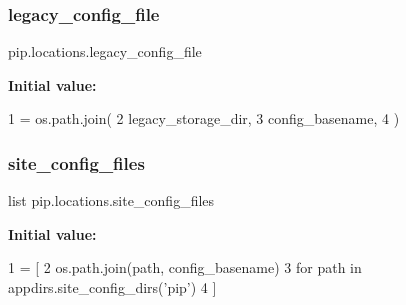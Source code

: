 \subsubsection{\texorpdfstring{legacy\+\_\+config\+\_\+file}{legacy\_config\_file}}
{\footnotesize\ttfamily pip.\+locations.\+legacy\+\_\+config\+\_\+file}

{\bfseries Initial value\+:}
\begin{DoxyCode}
1 =  os.path.join(
2         legacy\_storage\_dir,
3         config\_basename,
4     )
\end{DoxyCode}
\mbox{\label{namespacepip_1_1locations_ad4df8ee1051c2068139f30653041d0a8}} 
\subsubsection{\texorpdfstring{site\+\_\+config\+\_\+files}{site\_config\_files}}
{\footnotesize\ttfamily list pip.\+locations.\+site\+\_\+config\+\_\+files}

{\bfseries Initial value\+:}
\begin{DoxyCode}
1 =  [
2     os.path.join(path, config\_basename)
3     \textcolor{keywordflow}{for} path \textcolor{keywordflow}{in} appdirs.site\_config\_dirs(\textcolor{stringliteral}{'pip'})
4 ]
\end{DoxyCode}
